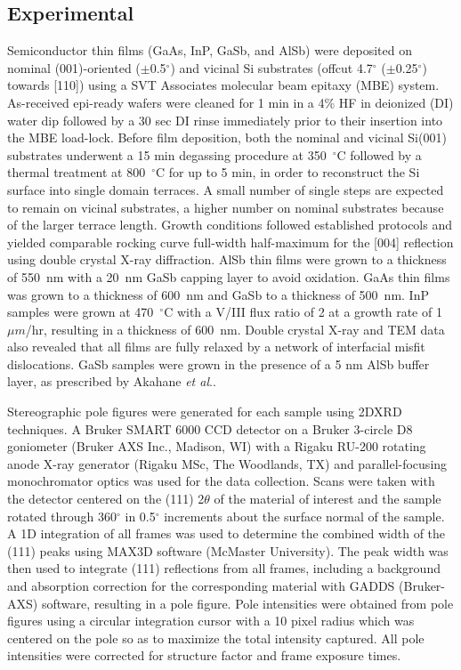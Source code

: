 \subsection{Experimental} 
Semiconductor thin films (GaAs, InP, GaSb, and AlSb) were deposited on nominal 
(001)-oriented ($\pm$0.5$^\circ$) and vicinal Si substrates (offcut 
4.7$^\circ$ ($\pm$0.25$^\circ$) towards [110]) using a SVT Associates 
molecular beam epitaxy (MBE) system. As-received epi-ready wafers were cleaned 
for 1 min in a 4\% HF in deionized (DI) water dip followed by a 30 sec DI 
rinse immediately prior to their insertion into the MBE load-lock. Before film 
deposition, both the nominal and vicinal Si(001) substrates underwent a 15 min 
degassing procedure at 350~$^\circ$C followed by a thermal treatment at 
800~$^\circ$C for up to 5 min, in order to reconstruct the Si surface into 
single domain 
terraces\cite{NeergaardWaltenburg1995,S1991,Sakamoto1986,Pehlke1991}. A small 
number of single steps are expected to remain on vicinal substrates, a higher 
number on nominal substrates because of the larger terrace length. Growth 
conditions followed established 
protocols\cite{Akahane2004,Balakrishnan2006a,Fischer1986} and yielded 
comparable rocking curve full-width half-maximum for the [004] reflection 
using double crystal X-ray diffraction. AlSb thin films were grown to a 
thickness of 550~nm with a 20~nm GaSb capping layer to avoid oxidation. GaAs 
thin films was grown to a thickness of 600~nm and GaSb to a thickness of 
500~nm. InP samples were grown at 470~$^\circ$C with a V/III flux ratio of 2 
at a growth rate of 1 $\mu m$/hr, resulting in a thickness of 600~nm. Double 
crystal X-ray and TEM data also revealed that all films are fully relaxed by a 
network of interfacial misfit dislocations\cite{Vajargah2011}. GaSb samples 
were grown in the presence of a 5 nm AlSb buffer layer, as prescribed by 
Akahane \textit{et al}.\cite{Akahane2004}.

Stereographic pole figures were generated for each sample using 2DXRD 
techniques. A Bruker SMART 6000 CCD detector on a Bruker 3-circle D8 
goniometer (Bruker AXS Inc., Madison, WI) with a Rigaku RU-200 rotating anode 
X-ray generator (Rigaku MSc, The Woodlands, TX) and parallel-focusing 
monochromator optics was used for the data collection. Scans were taken with 
the detector centered on the (111) 2$\theta$ of the material of interest and 
the sample rotated through 360$^\circ$ in 0.5$^\circ$ increments about the 
surface normal of the sample. A 1D integration of all frames was used to 
determine the combined width of the (111) peaks using MAX3D software (McMaster 
University)\cite{Britten2007}. The peak width was then used to integrate (111) 
reflections from all frames, including a background and absorption correction 
for the corresponding material with GADDS (Bruker-AXS) software, resulting in 
a pole figure. Pole intensities were obtained from pole figures using a 
circular integration cursor with a 10 pixel radius which was centered on the 
pole so as to maximize the total intensity captured. All pole intensities were 
corrected for structure factor and frame exposure times.

